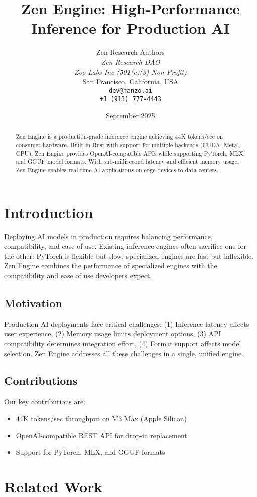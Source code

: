 \documentclass[11pt,a4paper]{article}
\title{Zen Engine: High-Performance Inference for Production AI}
\author{
    Zen Research Authors \\
    \textit{Zen Research DAO} \\
    \textit{Zoo Labs Inc (501(c)(3) Non-Profit)} \\
    San Francisco, California, USA \\
    \texttt{dev@hanzo.ai} \\
    \texttt{+1 (913) 777-4443}
}
\date{September 2025}
\begin{document}
\maketitle

\begin{abstract}
Zen Engine is a production-grade inference engine achieving 44K tokens/sec on consumer hardware. Built in Rust with support for multiple backends (CUDA, Metal, CPU), Zen Engine provides OpenAI-compatible APIs while supporting PyTorch, MLX, and GGUF model formats. With sub-millisecond latency and efficient memory usage, Zen Engine enables real-time AI applications on edge devices to data centers.
\end{abstract}

\section{Introduction}

Deploying AI models in production requires balancing performance, compatibility, and ease of use. Existing inference engines often sacrifice one for the other: PyTorch is flexible but slow, specialized engines are fast but inflexible. Zen Engine combines the performance of specialized engines with the compatibility and ease of use developers expect.

\subsection{Motivation}
Production AI deployments face critical challenges: (1) Inference latency affects user experience, (2) Memory usage limits deployment options, (3) API compatibility determines integration effort, (4) Format support affects model selection. Zen Engine addresses all these challenges in a single, unified engine.

\subsection{Contributions}
Our key contributions are:
\begin{itemize}
    \item 44K tokens/sec throughput on M3 Max (Apple Silicon)
    \item OpenAI-compatible REST API for drop-in replacement
    \item Support for PyTorch, MLX, and GGUF formats
\end{itemize}

\section{Related Work}
\end{document}
